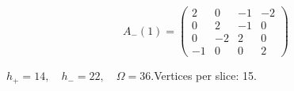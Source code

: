 \begin{minipage}{\linewidth}
\begin{minipage}[c]{0.495\linewidth}
\end{minipage}%
\begin{minipage}[c]{0.495\linewidth}\centering\fontsize{9.7}{12}\selectfont
\setlength{\abovedisplayskip}{4pt}\setlength{\belowdisplayskip}{4pt}
\setlength{\abovedisplayshortskip}{4pt}\setlength{\belowdisplayshortskip}{4pt}
\setlength{\arraycolsep}{3pt}\renewcommand{\arraystretch}{1.08}
\[A_{-}(1)=\begin{pmatrix}2 & 0 & -1 & -2\\0 & 2 & -1 & 0\\0 & -2 & 2 & 0\\-1 & 0 & 0 & 2\end{pmatrix}\]
\end{minipage}%
\par\smallskip\noindent\small $h_+=14,\quad h_-=22,\quad \Omega=36.$\quad Vertices per slice: 15.
\end{minipage}\par\vfill
